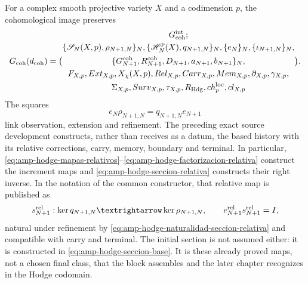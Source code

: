 For a complex smooth projective variety $X$ and a codimension $p$, the cohomological
image preserves
\begin{equation}\label{eq:pdf2-g-coh-explicito}
 \mathfrak G_{\rm coh}(d_{\rm coh})=
 \bigl(
 \begin{gathered}
  \mathfrak G_{\rm coh}^{\rm int};\\
  \{\mathscr S_N(X,p),\rho_{N+1,N}\}_N,
  \{\mathscr H_N^p(X),q_{N+1,N}\}_N,
  \{e_N\}_N,
  \{\iota_{N+1,N}\}_N,\\
  \{\mathcal G_{N+1}^{\rm coh},\mathcal R_{N+1}^{\rm coh},
       D_{N+1},a_{N+1},b_{N+1}\}_N,\\
  \mathcal F_{X,p},\operatorname{Ext}_{X,p},X_\chi(X,p),
  \operatorname{Rel}_{X,p},\operatorname{Carr}_{X,p},
  \operatorname{Mem}_{X,p},\partial_{X,p},\gamma_{X,p},\\
  \Sigma_{X,p},\operatorname{Surv}_{X,p},\tau_{X,p},
  R_{\rm Hdg},\operatorname{ch}^{\rm loc}_p,\operatorname{cl}_{X,p}
 \end{gathered}
 \bigr).
\end{equation}
The squares
\begin{equation}\label{eq:pdf2-g-coh-cuadrados}
 e_N\rho_{N+1,N}=q_{N+1,N}e_{N+1}
\end{equation}
link observation, extension and refinement. The preceding exact source development constructs, rather than receives as a datum, the based history with its relative corrections, carry, memory, boundary and terminal. In particular, \eqref{eq:amp-hodge-mapas-relativos}--\eqref{eq:amp-hodge-factorizacion-relativa} construct the increment maps and \eqref{eq:amp-hodge-seccion-relativa} constructs their right inverse. In the notation of the common constructor, that relative map is published as
\begin{equation}\label{eq:pdf2-g-coh-seccion-dato}
 s_{N+1}^{\rm rel}:\ker q_{N+1,N}\longrightarrow\ker\rho_{N+1,N},
 \qquad
 e_{N+1}^{\rm rel}s_{N+1}^{\rm rel}=I,
\end{equation}
natural under refinement by \eqref{eq:amp-hodge-naturalidad-seccion-relativa} and compatible with carry and terminal. The initial section is not assumed either: it is constructed in \eqref{eq:amp-hodge-seccion-base}. It is these already proved maps, not a chosen final class, that the block assembles and the later chapter recognizes in the Hodge codomain.


